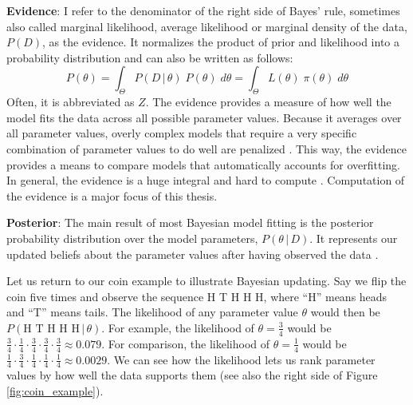 \documentclass[12pt, a4paper]{report}
\begin{document}
\textbf{Evidence}: I refer to the denominator of the right side of Bayes' rule, sometimes also called marginal likelihood, average likelihood or marginal density of the data, $P(D)$, as the evidence.
It normalizes the product of prior and likelihood into a probability distribution and can also be written as follows: 
\begin{equation}
    P(\theta) = \int_\Theta P(D \,|\, \theta) \; P(\theta) \; d\theta = \int_\Theta L(\theta) \; \pi(\theta) \; d\theta
    \label{eq:evidence}
\end{equation}
Often, it is abbreviated as $Z$.
The evidence provides a measure of how well the model fits the data across all possible parameter values.
Because it averages over all parameter values, overly complex models that require a very specific combination of parameter values to do well are penalized \cite[221]{mcelreath}.
This way, the evidence provides a means to compare models that automatically accounts for overfitting. 
In general, the evidence is a huge integral and hard to compute \cite[221]{mcelreath}.
Computation of the evidence is a major focus of this thesis.

\textbf{Posterior}: The main result of most Bayesian model fitting is the posterior probability distribution over the model parameters, $P(\theta \,|\, D)$.
It represents our updated beliefs about the parameter values after having observed the data \cite[36]{mcelreath}.

Let us return to our coin example to illustrate Bayesian updating.
Say we flip the coin five times and observe the sequence H T H H H, where ``H'' means heads and ``T'' means tails.
The likelihood of any parameter value $\theta$ would then be $P(\textrm{H T H H H} \, | \, \theta)$.
For example, the likelihood of $\theta = \frac{3}{4}$ would be $\frac{3}{4} \cdot \frac{1}{4} \cdot \frac{3}{4} \cdot \frac{3}{4} \cdot \frac{3}{4} \approx 0.079$.
For comparison, the likelihood of $\theta = \frac{1}{4}$ would be $\frac{1}{4} \cdot \frac{3}{4} \cdot \frac{1}{4} \cdot \frac{1}{4} \cdot \frac{1}{4} \approx 0.0029$.
We can see how the likelihood lets us rank parameter values by how well the data supports them (see also the right side of Figure \ref{fig:coin_example}).
\end{document}

